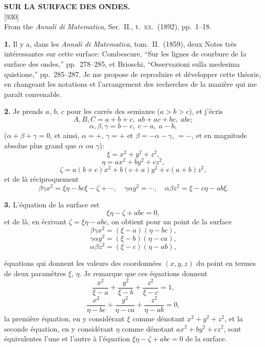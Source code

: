 \documentclass[11pt,a4paper]{article}
\newcommand{\paper}[3]{%
  \clearpage
  \begin{center}
    {\large\bfseries #2}\\[0.5em]
    {\small [#1]}\\[0.3em]
    {\small #3}
  \end{center}
  \vspace{0.5em}
}
\begin{document}
\paper{930}{SUR LA SURFACE DES ONDES.}{From the \textit{Annali di Matematica}, Ser.\ II., t.\ \textsc{xx}.\ (1892), pp.\ 1--18.}

\textbf{1.} Il y a, dans les \textit{Annali di Matematica}, tom.\ II.\ (1859), deux Notes tr\`es int\'eressantes sur cette surface: Combescure, ``Sur les lignes de courbure de la surface des ondes,'' pp.\ 278--285, et Brioschi, ``Osservazioni sulla medesima quistione,'' pp.\ 285--287. Je me propose de reproduire et d\'evelopper cette th\'eorie, en changeant les notations et l'arrangement des recherches de la mani\`ere qui me para\^it convenable.

\textbf{2.} Je prends $a$, $b$, $c$ pour les carr\'es des semiaxes ($a > b > c$), et j'\'ecris
\[
A, B, C = a + b + c,\; ab + ac + bc,\; abc;
\]
\[
\alpha, \beta, \gamma = b - c,\; c - a,\; a - b,
\]
($\alpha + \beta + \gamma = 0$, et ainsi, $\alpha = +$, $\gamma = +$ et $\beta = -\alpha - \gamma$, $= -$, et en magnitude absolue plus grand que $\alpha$ ou $\gamma$):
\[
\xi = x^2 + y^2 + z^2,
\]
\[
\eta = a x^2 + b y^2 + c z^2,
\]
\[
\zeta = a(b + c) x^2 + b(c + a) y^2 + c(a + b) z^2,
\]
et de l\`a r\'eciproquement
\[
\beta\gamma x^2 = \xi\eta - bc\xi - \zeta + \cdots,\quad \gamma\alpha y^2 = \cdots,\quad \alpha\beta z^2 = \xi - c\eta - ab\xi.
\]

\textbf{3.} L'\'equation de la surface est
\[
\xi\eta - \zeta + abc = 0,
\]
et de l\`a, en \'ecrivant $\zeta = \xi\eta - abc$, on obtient pour un point de la surface
\[
\beta\gamma x^2 = (\xi - a)(\eta - bc),
\]
\[
\gamma\alpha y^2 = (\xi - b)(\eta - ca),
\]
\[
\alpha\beta z^2 = (\xi - c)(\eta - ab),
\]

\'equations qui donnent les valeurs des coordonn\'ees $(x, y, z)$ du point en termes de deux param\`etres $\xi$, $\eta$. Je remarque que ces \'equations donnent
\[
\frac{x^2}{\xi - a} + \frac{y^2}{\xi - b} + \frac{z^2}{\xi - c} = 1,
\]
\[
\frac{x^2}{\eta - bc} + \frac{y^2}{\eta - ca} + \frac{z^2}{\eta - ab} = 0,
\]
la premi\`ere \'equation, en y consid\'erant $\xi$ comme d\'enotant $x^2 + y^2 + z^2$, et la seconde \'equation, en y consid\'erant $\eta$ comme d\'enotant $ax^2 + by^2 + cz^2$, sont \'equivalentes l'une et l'autre \`a l'\'equation $\xi\eta - \zeta + abc = 0$ de la surface.
\end{document}
